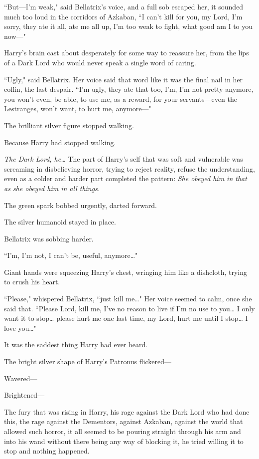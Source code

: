 ``But---I'm weak," said Bellatrix's voice, and a full sob escaped her, it sounded much too loud in the corridors of Azkaban, ``I can't kill for you, my Lord, I'm sorry, they ate it all, ate me all up, I'm too weak to fight, what good am I to you now---"

Harry's brain cast about desperately for some way to reassure her, from the lips of a Dark Lord who would never speak a single word of caring.

``Ugly," said Bellatrix. Her voice said that word like it was the final nail in her coffin, the last despair. ``I'm ugly, they ate that too, I'm, I'm not pretty anymore, you won't even, be able, to use me, as a reward, for your servants---even the Lestranges, won't want, to hurt me, anymore---"

The brilliant silver figure stopped walking.

Because Harry had stopped walking.

\emph{The Dark Lord, he{\ldots}} The part of Harry's self that was soft and vulnerable was screaming in disbelieving horror, trying to reject reality, refuse the understanding, even as a colder and harder part completed the pattern: \emph{She obeyed him in that as she obeyed him in all things.}

The green spark bobbed urgently, darted forward.

The silver humanoid stayed in place.

Bellatrix was sobbing harder.

``I'm, I'm not, I can't be, useful, anymore{\ldots}"

Giant hands were squeezing Harry's chest, wringing him like a dishcloth, trying to crush his heart.

``Please," whispered Bellatrix, ``just kill me{\ldots}" Her voice seemed to calm, once she said that. ``Please Lord, kill me, I've no reason to live if I'm no use to you{\ldots} I only want it to stop{\ldots} please hurt me one last time, my Lord, hurt me until I stop{\ldots} I love you{\ldots}"

It was the saddest thing Harry had ever heard.

The bright silver shape of Harry's Patronus flickered---

Wavered---

Brightened---

The fury that was rising in Harry, his rage against the Dark Lord who had done this, the rage against the Dementors, against Azkaban, against the world that allowed such horror, it all seemed to be pouring straight through his arm and into his wand without there being any way of blocking it, he tried willing it to stop and nothing happened.

